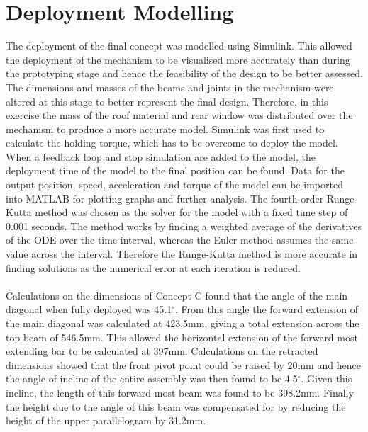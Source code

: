 \documentclass[a4paper]{article}
\begin{document}
\section{Deployment Modelling}
The deployment of the final concept was modelled using Simulink. This allowed the deployment of the mechanism to be visualised more accurately than during the prototyping stage and hence the feasibility of the design to be better assessed. The dimensions and masses of the beams and joints in the mechanism were altered at this stage to better represent the final design. Therefore, in this exercise the mass of the roof material and rear window was distributed over the mechanism to produce a more accurate model. Simulink was first used to calculate the holding torque, which has to be overcome to deploy the model. When a feedback loop and stop simulation are added to the model, the deployment time of the model to the final position can be found. Data for the output position, speed, acceleration and torque of the model can be imported into MATLAB for plotting graphs and further analysis. The fourth-order Runge-Kutta method was chosen as the solver for the model with a fixed time step of 0.001 seconds. The method works by finding a weighted average of the derivatives of the ODE over the time interval, whereas the Euler method assumes the same value across the interval. Therefore the Runge-Kutta method is more accurate in finding solutions as the numerical error at each iteration is reduced.

\paragraph{}
Calculations on the dimensions of Concept C found that the angle of the main diagonal when fully deployed was 45.1$^\circ$. From this angle the forward extension of the main diagonal was calculated at 423.5mm, giving a total extension across the top beam of 546.5mm. This allowed the horizontal extension of the forward most extending bar to be calculated at 397mm. Calculations on the retracted dimensions showed that the front pivot point could be raised by 20mm and hence the angle of incline of the entire assembly was then found to be 4.5$^\circ$. Given this incline, the length of this forward-most beam was found to be 398.2mm. Finally the height due to the angle of this beam was compensated for by reducing the height of the upper parallelogram by 31.2mm.
\end{document}
